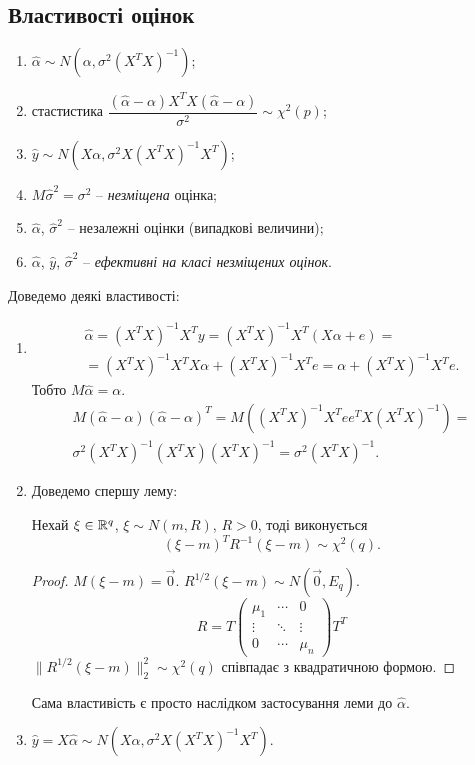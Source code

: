 \subsection{Властивості оцінок}
\begin{enumerate}
	\item $\widehat{\alpha} \sim N(\alpha, \sigma^2(X^TX)^{-1})$;
	\item стастистика $\dfrac{(\widehat{\alpha}-\alpha)X^TX(\widehat{\alpha}-\alpha)}{\sigma^2} \sim \chi^2(p)$;
	\item $\widehat{y} \sim N(X\alpha, \sigma^2 X(X^TX)^{-1}X^T)$;
	\item $M\widehat{\sigma}^2 = \sigma^2$ -- \textit{незміщена} оцінка;
	\item $\widehat{\alpha}$, $\widehat{\sigma}^2$ -- незалежні оцінки (випадкові величини);
	\item $\widehat{\alpha}$, $\widehat{y}$, $\widehat{\sigma}^2$ -- \textit{ефективні на класі незміщених оцінок}.
\end{enumerate}
Доведемо деякі властивості:
\begin{enumerate}
	\item 
	\begin{multline*} 
		\widehat{\alpha} = (X^TX)^{-1}X^Ty = (X^TX)^{-1}X^T(X\alpha+e) = \\
		= (X^TX)^{-1}X^TX\alpha + (X^TX)^{-1}X^Te = \alpha + (X^TX)^{-1}X^Te.
	\end{multline*}
	Тобто $M\widehat{\alpha} = \alpha$. 
	\begin{multline*} 
		M(\widehat{\alpha}-\alpha)(\widehat{\alpha}-\alpha)^T = M((X^TX)^{-1}X^Tee^TX(X^TX)^{-1}) = \\
		\sigma^2 (X^TX)^{-1}(X^TX)(X^TX)^{-1} = \sigma^2 (X^TX)^{-1}.
	\end{multline*}
	\item Доведемо спершу лему:
	\begin{lemma}
		Нехай $\xi \in \mathbb{R}^q$, $\xi \sim N(m, R)$, $R > 0$, тоді виконується \[ (\xi-m)^TR^{-1}(\xi-m)\sim\chi^2(q).\]
	\end{lemma}
	\begin{proof}
		$M(\xi-m)=\vec0$. $R^{1/2}(\xi - m)\sim N(\vec0,E_q)$. \[R = T \begin{pmatrix} \mu_1 & \cdots & 0 \\
 \vdots & \ddots & \vdots \\
 0 & \cdots & \mu_n \end{pmatrix} T^T\] $\|R^{1/2}(\xi-m)\|_2^2 \sim \chi^2(q)$ співпадає з квадратичною формою.
	\end{proof}
	Сама властивість є просто наслідком застосування леми до $\widehat{\alpha}$.
	\item $\widehat{y} = X \widehat{\alpha} \sim N(X\alpha, \sigma^2X(X^TX)^{-1}X^T)$.
\end{enumerate}
